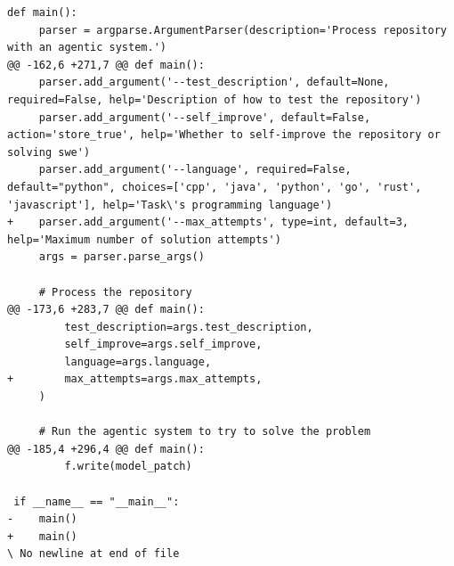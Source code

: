 \documentclass{article}
\begin{document}
\begin{lstlisting}[style=diffstyle]
 def main():
     parser = argparse.ArgumentParser(description='Process repository with an agentic system.')
@@ -162,6 +271,7 @@ def main():
     parser.add_argument('--test_description', default=None, required=False, help='Description of how to test the repository')
     parser.add_argument('--self_improve', default=False, action='store_true', help='Whether to self-improve the repository or solving swe')
     parser.add_argument('--language', required=False, default="python", choices=['cpp', 'java', 'python', 'go', 'rust', 'javascript'], help='Task\'s programming language')
+    parser.add_argument('--max_attempts', type=int, default=3, help='Maximum number of solution attempts')
     args = parser.parse_args()
 
     # Process the repository
@@ -173,6 +283,7 @@ def main():
         test_description=args.test_description,
         self_improve=args.self_improve,
         language=args.language,
+        max_attempts=args.max_attempts,
     )
 
     # Run the agentic system to try to solve the problem
@@ -185,4 +296,4 @@ def main():
         f.write(model_patch)
 
 if __name__ == "__main__":
-    main()
+    main()
\ No newline at end of file
\end{lstlisting}
\end{document}
